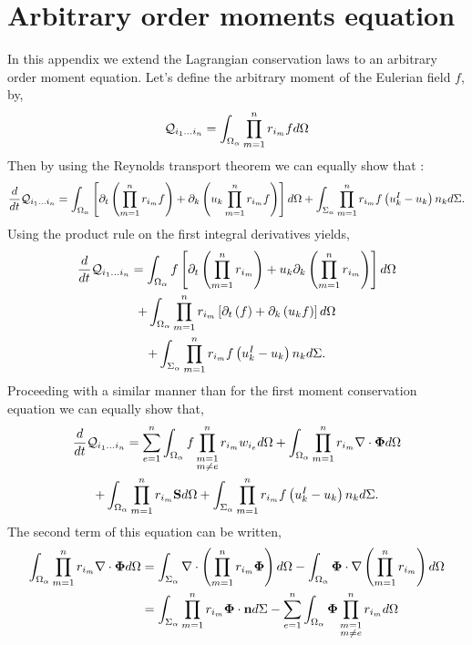 
\section{Arbitrary order moments equation}
\label{ap:Moments_equations}
In this appendix we extend the Lagrangian conservation laws to an arbitrary order moment equation. 
Let's define the arbitrary moment of the Eulerian field $f$, by, 
\begin{equation*}
    \mathcal{Q}_{i_1\ldots i_n}
    = \int_{\Omega_\alpha} 
    \prod_{m=1}^{n} r_{i_m} f d\Omega
\end{equation*}
Then by using the Reynolds transport theorem we can equally show that :
\begin{equation}
    \frac{d}{dt} {\mathcal{Q}_{i_1\ldots i_n}}
    =\int_{\Omega_\alpha} \left[ \partial_t \left(\prod_{m=1}^{n} r_{i_m}f\right) 
    + \partial_k \left(u_k \prod_{m=1}^{n} r_{i_m}f\right) \right]d\Omega
    +\int_{\Sigma_\alpha} \prod_{m=1}^{n} r_{i_m} f \left(u^I_k - u_k\right) n_k d\Sigma.
\end{equation}
Using the product rule on the first integral derivatives yields, 
\begin{multline*}
    \frac{d}{dt} {\mathcal{Q}_{i_1\ldots i_n}}
    =\int_{\Omega_\alpha} f \left[ \partial_t \left(\prod_{m=1}^{n} r_{i_m}\right) 
    + u_k \partial_k \left( \prod_{m=1}^{n} r_{i_m}\right) \right]d\Omega\\
    +\int_{\Omega_\alpha} \prod_{m=1}^{n} r_{i_m} \left[ \partial_t \left(f\right) 
    +  \partial_k \left(u_k f \right) \right]d\Omega\\
    +\int_{\Sigma_\alpha} \prod_{m=1}^{n} r_{i_m} f \left(u^I_k - u_k\right) n_k d\Sigma.
\end{multline*}
Proceeding with a similar manner than for the first moment conservation equation we can equally show that, 
\begin{multline*}
    \frac{d}{dt} {\mathcal{Q}_{i_1\ldots i_n}}
    = \sum_{e=1}^{n} \int_{\Omega_\alpha} f  \prod^{n}_{\substack{ m=1 \\   m \neq e}} r_{i_m} w_{i_e}d\Omega
    +\int_{\Omega_\alpha} \prod_{m=1}^{n} r_{i_m} \mathbf{\nabla}\cdot\mathbf{\Phi} d\Omega\\
    + \int_{\Omega_\alpha} \prod_{m=1}^{n} r_{i_m} \textbf{S} d\Omega
    +\int_{\Sigma_\alpha} \prod_{m=1}^{n} r_{i_m} f \left(u^I_k - u_k\right) n_k d\Sigma.
\end{multline*}
The second term of this equation can be written,
\begin{align*}
    \int_{\Omega_\alpha} \prod_{m=1}^{n} r_{i_m} \mathbf{\nabla}\cdot\mathbf{\Phi} d\Omega
    &= \int_{\Sigma_\alpha} \mathbf{\nabla}\cdot \left(\prod_{m=1}^{n} r_{i_m} \mathbf{\Phi} \right)d\Omega
    - \int_{\Omega_\alpha} \mathbf{\Phi} \cdot \mathbf{\nabla} \left(\prod_{m=1}^{n} r_{i_m} \right)d\Omega\\
    &= \int_{\Sigma_\alpha} \prod_{m=1}^{n} r_{i_m} \mathbf{\Phi} \cdot \textbf{n}d\Sigma
    -\sum_{e=1}^{n} \int_{\Omega_\alpha} \mathbf{\Phi}  \prod^{n}_{\substack{ m=1 \\m \neq e}} r_{i_m}  d\Omega
\end{align*}
